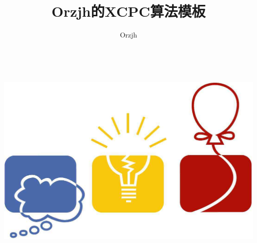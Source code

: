 \documentclass[a4]{article}
\title{\CJKfamily{hei} \bfseries Orzjh的XCPC算法模板}
\author{Orzjh}
\begin{document}
\small

\begin{titlepage}

\maketitle

\centerline{\includegraphics[height=10cm,width=15cm]{logo.jpg}}

\end{titlepage}

\newpage
\begin{multicols}{2}       %
\pagestyle{empty}
\renewcommand{\contentsname}{目录}
\tableofcontents
\newpage\clearpage
\newpage
\pagestyle{fancy}
\setcounter{page}{1}   %
\end{multicols}








\end{document}
